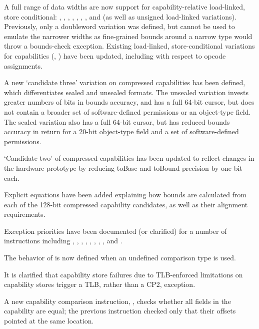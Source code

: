 \begin{description}
  A full range of data widths are now support for capability-relative
  load-linked, store conditional: , ,
  , , ,
  , , and  (as well as
  unsigned load-linked variations).
  Previously, only a doubleword variation was defined, but cannot be used to
  emulate the narrower widths as fine-grained bounds around a narrow type
  would throw a bounds-check exception.
  Existing load-linked, store-conditional variations for capabilities
  (, ) have been updated, including with
  respect to opcode assignments.

  A new `candidate three' variation on compressed capabilities has been
  defined, which differentiates sealed and unsealed formats.
  The unsealed variation invests greater numbers of bits in bounds accuracy,
  and has a full 64-bit cursor, but does not contain a broader set of
  software-defined permissions or an object-type field.
  The sealed variation also has a full 64-bit cursor, but has reduced bounds
  accuracy in return for a 20-bit object-type field and a set of
  software-defined permissions.

  `Candidate two' of compressed capabilities has been updated to reflect
  changes in the hardware prototype by reducing toBase and toBound precision
  by one bit each.

  Explicit equations have been added explaining how bounds are calculated
  from each of the 128-bit compressed capability candidates, as well as their
  alignment requirements.

  Exception priorities have been documented (or clarified) for a number of
  instructions including , ,
  , , ,
  , , , and
  .

  The behavior of  is now defined when an undefined
  comparison type is used.

  It is clarified that capability store failures due to TLB-enforced
  limitations on capability stores trigger a TLB, rather than a CP2,
  exception.

  A new capability comparison instruction, , checks
  whether all fields in the capability are equal; the previous
   instruction checked only that their offsets pointed at the
  same location.


\end{description}
